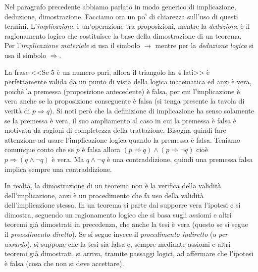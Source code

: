 Nel paragrafo precedente abbiamo parlato in modo generico di implicazione, deduzione, dimostrazione. Facciamo ora un po' di chiarezza sull'uso di questi termini. L'\emph{implicazione} è un'operazione tra proposizioni, mentre la \emph{deduzione} è il ragionamento logico che costituisce la base della dimostrazione di un teorema. Per l'\emph{implicazione materiale} si usa il simbolo $\rightarrow$ mentre per la \emph{deduzione logica} si usa il simbolo $\Rightarrow$.

La frase <<Se 5 è un numero pari, allora il triangolo ha 4 lati>> è perfettamente valida da un punto di vista della logica matematica ed anzi è vera, poiché la premessa (proposizione antecedente) è falsa, per cui l'implicazione è vera anche se la proposizione conseguente è falsa (si tenga presente la tavola di verità di $p\Rightarrow q$).
Si noti però che la definizione di implicazione ha senso solamente se la premessa è vera, il suo ampliamento al caso in cui la premessa è falsa è motivata da ragioni di completezza della trattazione. Bisogna quindi fare attenzione ad usare l'implicazione logica quando la premessa è falsa. Teniamo comunque conto che se $p$ è falsa allora $(p\Rightarrow q)\wedge (p\Rightarrow \neg q)$ cioè $p\Rightarrow (q\wedge \neg q)$ è vera. Ma $q\wedge\neg q$ è una contraddizione, quindi una premessa falsa implica sempre una contraddizione.

In realtà, la dimostrazione di un teorema non è la verifica della validità dell'implicazione, anzi è un procedimento che fa uso della validità dell'implicazione stessa. In un teorema si parte dal supporre vera l'ipotesi e si dimostra, seguendo un ragionamento logico che si basa sugli assiomi e altri teoremi già dimostrati in precedenza, che anche la tesi è vera (questo se si segue il \emph{procedimento diretto}). Se si segue invece il \emph{procedimento indiretto} (o \emph{per assurdo}), si suppone che la tesi sia falsa e, sempre mediante assiomi e altri teoremi già dimostrati, si arriva, tramite passaggi logici, ad affermare che l'ipotesi è falsa (cosa che non si deve accettare).


